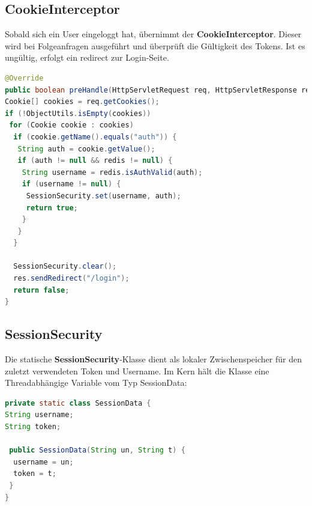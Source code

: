 \documentclass[
    a4paper
]{scrreprt}
\begin{document}
	\subsection{CookieInterceptor}
	Sobald sich ein User eingeloggt hat, übernimmt der \textbf{CookieInterceptor}. Dieser wird bei Folgeanfragen ausgeführt und überprüft die Gültigkeit des Tokens. Ist es ungültig, erfolgt ein redirect zur Login-Seite.
	\begin{lstlisting}[language=java]
@Override
public boolean preHandle(HttpServletRequest req, HttpServletResponse res, Object handler) throws Exception {
Cookie[] cookies = req.getCookies();
if (!ObjectUtils.isEmpty(cookies))
 for (Cookie cookie : cookies)
  if (cookie.getName().equals("auth")) {
   String auth = cookie.getValue();
   if (auth != null && redis != null) {
    String username = redis.isAuthValid(auth);
    if (username != null) {
     SessionSecurity.set(username, auth);
     return true;
    }
   }
  }

  SessionSecurity.clear();
  res.sendRedirect("/login");
  return false;
}
	\end{lstlisting}
	
	\subsection{SessionSecurity}
	Die statische \textbf{SessionSecurity}-Klasse dient als lokaler Zwischenspeicher für den zuletzt verwendeten Token und Username. Im Kern hält die Klasse eine Threadabhängige Variable vom Typ SessionData:
	\begin{lstlisting}[language=java]
private static class SessionData {
String username;
String token;

 public SessionData(String un, String t) {
  username = un;
  token = t;
 }
}
	\end{lstlisting}
	
\end{document}
